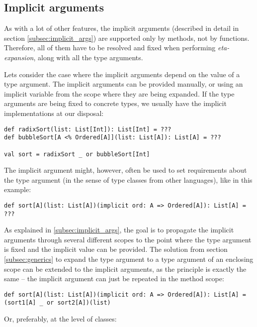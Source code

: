 \subsection{Implicit arguments}

As with a lot of other features, the implicit arguments (described in detail in section \ref{subsec:implicit_args}) are supported only by methods, not by functions. Therefore, all of them have to be resolved and fixed when performing \textit{eta-expansion}, along with all the type arguments. 

Lets consider the case where the implicit arguments depend on the value of a type argument. The implicit arguments can be provided manually, or using an implicit variable from the scope where they are being expanded. If the type arguments are being fixed to concrete types, we usually have the implicit implementations at our disposal:

\lstset{style=Scala}
\begin{lstlisting}
def radixSort(list: List[Int]): List[Int] = ???
def bubbleSort[A <% Ordered[A]](list: List[A]): List[A] = ???

val sort = radixSort _ or bubbleSort[Int]
\end{lstlisting}

The implicit argument might, however, often be used to set requirements about the type argument (in the sense of type classes from other languages), like in this example:
\lstset{style=Scala}
\begin{lstlisting}
def sort[A](list: List[A])(implicit ord: A => Ordered[A]): List[A] = ???
\end{lstlisting}

As explained in \ref{subsec:implicit_args}, the goal is to propagate the implicit arguments through several different scopes to the point where the type argument is fixed and the implicit value can be provided. The solution from section \ref{subsec:generics} to expand the type argument to a type argument of an enclosing scope can be extended to the implicit arguments, as the principle is exactly the same -- the implicit argument can just be repeated in the method scope:

\lstset{style=Scala}
\begin{lstlisting}
def sort[A](list: List[A])(implicit ord: A => Ordered[A]): List[A] = (sort1[A] _ or sort2[A])(list)
\end{lstlisting}

Or, preferably, at the level of classes:

